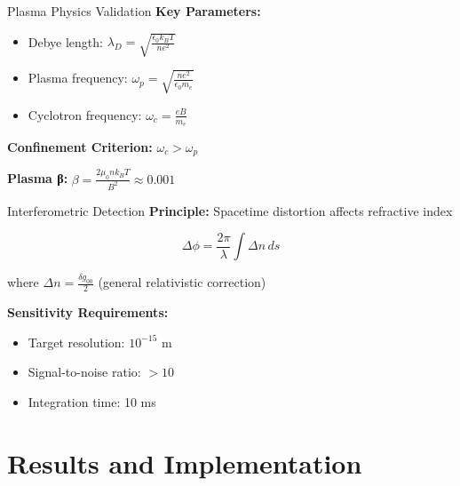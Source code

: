 \documentclass[aspectratio=169,xcolor={table,dvipsnames}]{beamer}
\begin{document}
\begin{frame}{Plasma Physics Validation}
    \textbf{Key Parameters:}
    \begin{itemize}
        \item Debye length: $\lambda_D = \sqrt{\frac{\epsilon_0 k_B T}{n e^2}}$
        \item Plasma frequency: $\omega_p = \sqrt{\frac{n e^2}{\epsilon_0 m_e}}$
        \item Cyclotron frequency: $\omega_c = \frac{e B}{m_e}$
    \end{itemize}
    
    \vspace{0.3cm}
    \textbf{Confinement Criterion:} $\omega_c > \omega_p$
    
    \textbf{Plasma β:} $\beta = \frac{2\mu_0 n k_B T}{B^2} \approx 0.001$
\end{frame}

\begin{frame}{Interferometric Detection}
    \textbf{Principle:} Spacetime distortion affects refractive index
    
    \begin{equation}
        \Delta \phi = \frac{2\pi}{\lambda} \int \Delta n \, ds
    \end{equation}
    
    where $\Delta n = \frac{\delta g_{00}}{2}$ (general relativistic correction)
    
    \vspace{0.3cm}
    \textbf{Sensitivity Requirements:}
    \begin{itemize}
        \item Target resolution: $10^{-15}$ m
        \item Signal-to-noise ratio: $>10$
        \item Integration time: 10 ms
    \end{itemize}
\end{frame}

\section{Results and Implementation}
\end{document}
